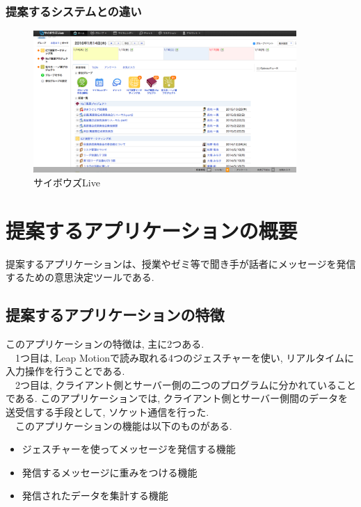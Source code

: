 \documentclass{funthesis}
\begin{document}
\subsection{提案するシステムとの違い}


\begin{figure}[H]
 \begin{center}
  \includegraphics[width=100mm]{./img/cybozulive.png}
 \end{center}
 \caption{サイボウズLive}
 \label{cybozu}
\end{figure}


\chapter{提案するアプリケーションの概要}

提案するアプリケーションは、授業やゼミ等で聞き手が話者にメッセージを発信するための意思決定ツールである. 

\section{提案するアプリケーションの特徴}


このアプリケーションの特徴は, 主に2つある.\\
　1つ目は, Leap Motionで読み取れる4つのジェスチャーを使い, リアルタイムに入力操作を行うことである. \\
　2つ目は, クライアント側とサーバー側の二つのプログラムに分かれていることである. このアプリケーションでは, クライアント側とサーバー側間のデータを送受信する手段として, ソケット通信を行った. \\
　このアプリケーションの機能は以下のものがある.
\begin{itemize}
 \item ジェスチャーを使ってメッセージを発信する機能
 \item 発信するメッセージに重みをつける機能
 \item 発信されたデータを集計する機能
\end{itemize}
\end{document}
